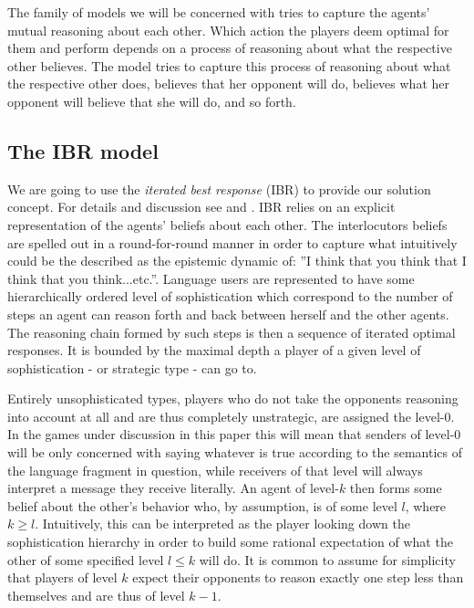 \documentclass[10]{article}
\begin{document}
The family of models we will be concerned with tries to capture the agents' mutual reasoning about each other. Which action the players deem optimal for them and perform depends on a process of reasoning about what the respective other believes. The model tries to capture this process of reasoning about what the respective other does, believes that her opponent will do, believes what her opponent will believe that she will do, and so forth. %
\subsection{The IBR model}
We are going to use the \textit{iterated best response} (IBR) to provide our solution concept. %
For details and discussion see \cite{franke2009signal} and \cite{franke2014pragmatic}. IBR relies on an explicit representation of the agents' beliefs about each other. The interlocutors beliefs are spelled out in a round-for-round manner in order to capture what intuitively could be the described as the epistemic dynamic of: ''I think that you think that I think that you think...etc.''. Language users are represented to have some hierarchically ordered level of sophistication which correspond to the number of steps an agent can reason forth and back between herself and the other agents. The reasoning chain formed by such steps is then a sequence of iterated optimal responses. It is bounded by the maximal depth a player of a given level of sophistication - or strategic type - can go to.

Entirely unsophisticated types, players who do not take the opponents reasoning into account at all and are thus completely unstrategic, are assigned the level-0. In the games under discussion in this paper this will mean that senders of level-0 will be only concerned with saying whatever is true according to the semantics of the language fragment in question, while receivers of that level will always interpret a message they receive literally. An agent of level-$k$ then forms some belief about the other's behavior who, by assumption, is of some level $l$, where $k\geq l$. Intuitively, this can be interpreted as the player looking down the sophistication hierarchy in order to build some rational expectation of what the other of some specified level $l\leq k$ will do. It is common to assume for simplicity that players of level $k$ expect their opponents to reason exactly one step less than themselves and are thus of level $k-1$.
\end{document}
